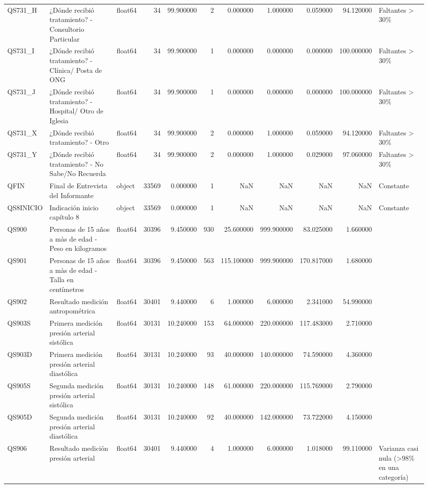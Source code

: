 \begin{longtable}{lllrrrrrrrl}
QS731\_H & ¿Dónde recibió tratamiento? -  Consultorio Particular & float64 & 34 & 99.900000 & 2 & 0.000000 & 1.000000 & 0.059000 & 94.120000 & Faltantes > 30\% \\
QS731\_I & ¿Dónde recibió tratamiento? -  Clínica/ Posta de ONG & float64 & 34 & 99.900000 & 1 & 0.000000 & 0.000000 & 0.000000 & 100.000000 & Faltantes > 30\% \\
QS731\_J & ¿Dónde recibió tratamiento? - Hospital/ Otro de Iglesia & float64 & 34 & 99.900000 & 1 & 0.000000 & 0.000000 & 0.000000 & 100.000000 & Faltantes > 30\% \\
QS731\_X & ¿Dónde recibió tratamiento? -  Otro & float64 & 34 & 99.900000 & 2 & 0.000000 & 1.000000 & 0.059000 & 94.120000 & Faltantes > 30\% \\
QS731\_Y & ¿Dónde recibió tratamiento? -  No Sabe/No Recuerda & float64 & 34 & 99.900000 & 2 & 0.000000 & 1.000000 & 0.029000 & 97.060000 & Faltantes > 30\% \\
QFIN & Final de Entrevista del Informante & object & 33569 & 0.000000 & 1 & NaN & NaN & NaN & NaN & Constante \\
QS8INICIO & Indicación inicio capítulo 8 & object & 33569 & 0.000000 & 1 & NaN & NaN & NaN & NaN & Constante \\
QS900 & Personas de 15 años a màs de edad - Peso en kilogramos & float64 & 30396 & 9.450000 & 930 & 25.600000 & 999.900000 & 83.025000 & 1.660000 &  \\
QS901 & Personas de 15 años a màs de edad - Talla en centímetros & float64 & 30396 & 9.450000 & 563 & 115.100000 & 999.900000 & 170.817000 & 1.680000 &  \\
QS902 & Resultado medición antropométrica & float64 & 30401 & 9.440000 & 6 & 1.000000 & 6.000000 & 2.341000 & 54.990000 &  \\
QS903S & Primera medición presión arterial sistólica & float64 & 30131 & 10.240000 & 153 & 64.000000 & 220.000000 & 117.483000 & 2.710000 &  \\
QS903D & Primera medición presión arterial diastólica & float64 & 30131 & 10.240000 & 93 & 40.000000 & 140.000000 & 74.590000 & 4.360000 &  \\
QS905S & Segunda medición presión arterial sistólica & float64 & 30131 & 10.240000 & 148 & 61.000000 & 220.000000 & 115.769000 & 2.790000 &  \\
QS905D & Segunda medición presión arterial diastólica & float64 & 30131 & 10.240000 & 92 & 40.000000 & 142.000000 & 73.722000 & 4.150000 &  \\
QS906 & Resultado medición presión arterial & float64 & 30401 & 9.440000 & 4 & 1.000000 & 6.000000 & 1.018000 & 99.110000 & Varianza casi nula (>98\% en una categoría) \\

\end{longtable}
